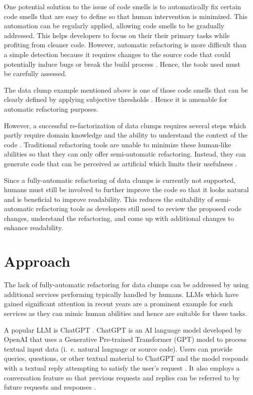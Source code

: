 One potential solution to the issue of code smells is to automatically fix certain code smells that are easy to define so that human intervention is minimized. This automation can be regularly applied, allowing code smells to be gradually addressed. This helps developers to focus on their their primary tasks while profiting from cleaner code. 
However,  automatic refactoring  is more difficult than a simple detection because it requires changes to the source code that could potentially induce bugs or break the build process \cite{9796303}. Hence, the tools used must be carefully assessed. 

The data clump example mentioned above is one of those code smells that can be clearly defined by applying subjective thresholds \cite{zhangImprovingPrecisionFowler2008}. Hence it is amenable for automatic refactoring purposes. 


However, a successful re-factorization of data clumps requires several steps which partly require domain knowledge and the ability to understand the context of the code \cite{martin2009clean}. Traditional refactoring tools are unable to minimize these human-like abilities so that they can only offer semi-automatic refactoring.   Instead, they can generate code that can be  perceived as artificial which limits their usefulness \cite{pomian2024furtherllmsidestatic}. 

Since a fully-automatic refactoring of data clumps is currently not supported, humans must still be involved to further improve the code so that it looks natural and is beneficial to improve readability. This reduces the suitability of semi-automatic refactoring tools as developers still need to review the proposed code changes, understand the refactoring, and come up with additional changes to enhance readability. 



\section{Approach}

The lack of fully-automatic refactoring for data clumps can be addressed by using additional 
  services performing typically handled by humans.  \acp{LLM} which have gained significant attention in recent years are a prominent example for such services as they can mimic human abilities and hence are suitable for these tasks.
  
  A popular \ac{LLM} is ChatGPT \cite{ChatGPT_url}. ChatGPT is an AI language model developed by OpenAI that uses a Generative Pre-trained Transformer (GPT) model to process textual input data (i.~e. natural language or source code). Users can provide queries, questions, or other textual material to ChatGPT and the model responds with a textual reply attempting to satisfy the user's request \cite{yetistirenEvaluatingCodeQuality2023}. It also employs a conversation feature so that previous requests and replies can be referred to by future requests and responses \cite{sobania2023analysis}.

